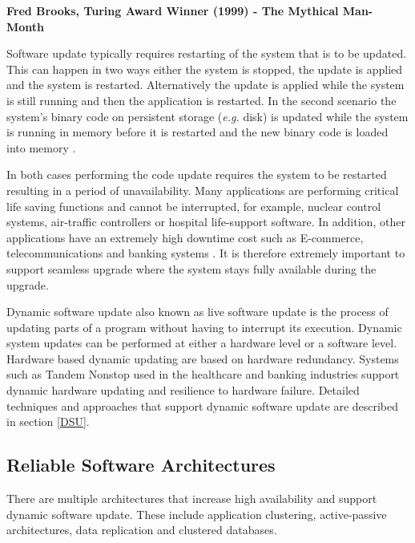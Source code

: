 \documentclass[a4paper,11pt,twoside]{article}
\begin{document}
\hfill \textbf{Fred Brooks, Turing Award Winner (1999) -  The Mythical Man-Month}\bigskip

Software update typically requires restarting of the system that is to be updated. This can happen in two ways either the system is stopped, the update is applied and the system is restarted. Alternatively the update is applied while the system is still running and then the application is restarted. In the second scenario the system's binary code on persistent storage (\textit{e.g.} disk) is updated while the system is running in memory before it is restarted and the new binary code is loaded into memory \cite{Java}. 

In both cases performing the code update requires the system to be restarted resulting in a period of unavailability. Many applications are performing critical life saving functions and cannot be interrupted, for example, nuclear control systems, air-traffic controllers or hospital life-support software. In addition, other applications have an extremely high downtime cost such as E-commerce, telecommunications and banking systems \cite{fly}. It is therefore extremely important to support seamless upgrade where the system stays fully available during the upgrade. 

Dynamic software update also known as live software update is the process of updating parts of a program without having to interrupt its execution. Dynamic system updates can be performed at either a hardware level or a software level. Hardware based dynamic updating are based on hardware redundancy. Systems such as Tandem Nonstop \cite{Tandem} used in the healthcare and banking industries support dynamic hardware updating and resilience to hardware failure. Detailed techniques and approaches that support dynamic software update are described in section \ref{DSU}. 


\subsection{Reliable Software Architectures} \label{Architectures}
There are multiple architectures that increase high availability and support dynamic software update. These include application clustering, active-passive architectures, data replication and clustered databases.
\end{document}
